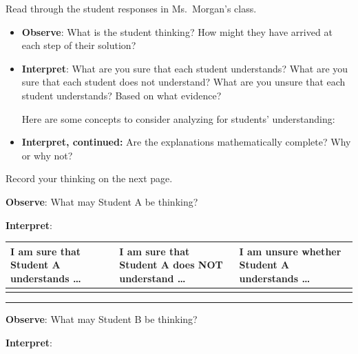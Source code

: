 \documentclass[11pt]{article}
\theoremstyle{definition}
\begin{document}
Read through the student responses in Ms.~Morgan's class.

\begin{itemize}
\item {\bf Observe}: What is the student thinking? How might they have arrived at each step of their solution?
\item {\bf Interpret}: What are you sure that each student understands? What are you sure that each student
does not understand? What are you unsure that each student understands?  Based on what evidence?

Here are some concepts to consider analyzing for students' understanding:

	\vspace*{-2pt}
	
\item {\bf Interpret, continued:} Are the explanations mathematically complete? Why or why not?
	
\end{itemize}

Record your thinking on the next page.

\newpage

{\bf Observe}: What may Student A be thinking?

{\bf Interpret}: 

\begin{tabular}{C{1.75in}|C{1.75in}|C{1.75in}}
I am sure that Student A understands \dots  & I am sure that Student A
does NOT understand \dots & I am unsure whether
Student A understands \dots  \\ \hline
& & \vspace*{1.75in}\\
\end{tabular}
\vspace*{2pt}
\hrule
\vspace*{2pt}

{\bf Observe}: What may Student B be thinking?

{\bf Interpret}: 
\end{document}
